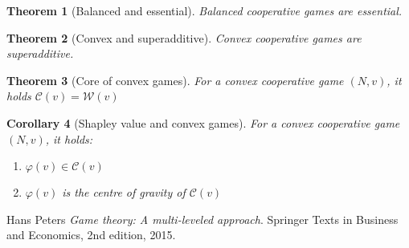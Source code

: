 \documentclass[12pt]{report}
\newcounter{theorem}
\newtheorem{theorem}{Theorem}
\newtheorem{corollary}[theorem]{Corollary}
\def\phi{\varphi}
\begin{document}
\begin{theorem}[Balanced and essential]
  Balanced cooperative games are essential.
\end{theorem}

\begin{theorem}[Convex and superadditive]
  Convex cooperative games are superadditive.
\end{theorem}

\begin{theorem}[Core of convex games]
  For a convex cooperative game $(N,v)$, it holds $\mathcal{C}(v)=\mathcal{W}(v)$
\end{theorem}

\begin{corollary}[Shapley value and convex games]
  For a convex cooperative game $(N,v)$, it holds:
	\begin{enumerate}
		\item $\phi(v) \in \mathcal{C}(v)$
		\item $\phi(v)$ is the centre of gravity of $\mathcal{C}(v)$
	\end{enumerate}
\end{corollary}

\literaturestart
	
Hans Peters 
\textit{Game theory: A multi-leveled approach}. 
Springer Texts in Business and Economics, 2nd edition, 2015.
 

\literatureend
\end{document}
